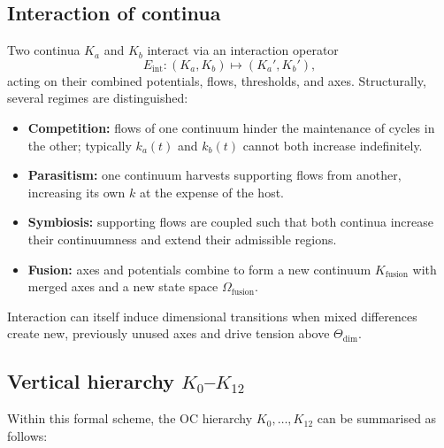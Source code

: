 \subsection{Interaction of continua}

Two continua \(K_a\) and \(K_b\) interact via an interaction operator
\[
    E_{\mathrm{int}} : (K_a,K_b) \mapsto (K_a',K_b'),
\]
acting on their combined potentials, flows, thresholds, and axes.
Structurally, several regimes are distinguished:

\begin{itemize}
    \item \textbf{Competition:} flows of one continuum hinder the maintenance of cycles in the other; typically \(k_a(t)\) and \(k_b(t)\) cannot both increase indefinitely.
    \item \textbf{Parasitism:} one continuum harvests supporting flows from another, increasing its own \(k\) at the expense of the host.
    \item \textbf{Symbiosis:} supporting flows are coupled such that both continua increase their continuumness and extend their admissible regions.
    \item \textbf{Fusion:} axes and potentials combine to form a new continuum \(K_{\mathrm{fusion}}\) with merged axes and a new state space \(\Omega_{\mathrm{fusion}}\).
\end{itemize}

Interaction can itself induce dimensional transitions when mixed differences
create new, previously unused axes and drive tension above
\(\Theta_{\mathrm{dim}}\).

\subsection{Vertical hierarchy \texorpdfstring{$K_0$–$K_{12}$}{K0--K12}}

Within this formal scheme, the OC hierarchy \(K_0,\dots,K_{12}\) can be summarised as follows:

